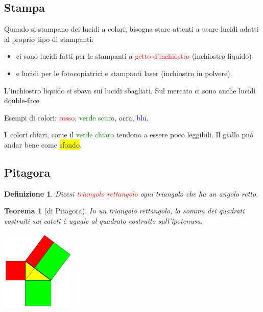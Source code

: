 \documentclass[a4,portrait,italian]{seminar}
\newcommand{\rosso}[1]{\textcolor{red}{#1}}
\newcommand{\verdescuro}[1]{\textcolor{darkgreen}{#1}}
\newcommand{\blu}[1]{\textcolor{blue}{#1}}
\newcommand{\ocra}[1]{\textcolor{ocra}{#1}}
\newcommand{\sfondogiallo}[1]{\colorbox{yellow}{#1}}
\theoremstyle{Ocra}
\newtheorem{teorema}{Teorema}
\theoremstyle{Blu}
\theoremstyle{Verde}
\newtheorem{definizione}{Definizione}
\begin{document}
\begin{slide*}

\section{Stampa}

Quando si stampano dei lucidi a colori, bisogna stare attenti a usare lucidi adatti al proprio tipo di stampanti:

\begin{itemize}

\item ci sono lucidi fatti per le stampanti a \rosso{getto d'inchiostro} (inchiostro liquido)

\item e lucidi per le fotocopiatrici e stampanti laser (inchiostro in polvere).

\end{itemize}

L'inchiostro liquido si sbava sui lucidi sbagliati. Sul mercato ci sono anche lucidi double-face.

Esempi di colori: \rosso{rosso}, \verdescuro{verde scuro}, \ocra{ocra}, \blu{blu}.

I~colori chiari, come il \textcolor{green}{verde chiaro} tendono a essere poco leggibili. Il giallo pu\`o andar bene come \sfondogiallo{sfondo}.

\end{slide*}
\begin{slide*}

\section{Pitagora}

\begin{definizione}
Dicesi \rosso{triangolo rettangolo} ogni triangolo che ha un angolo retto.
\end{definizione}

\begin{teorema}[di Pitagora]
In un triangolo rettangolo, la somma dei quadrati costruiti sui cateti \`e uguale al quadrato costruito sull'ipotenusa.
\end{teorema}

\begin{center}
\includegraphics[width=100pt]{pitagora3}
\end{center}

\end{slide*}
\end{document}
